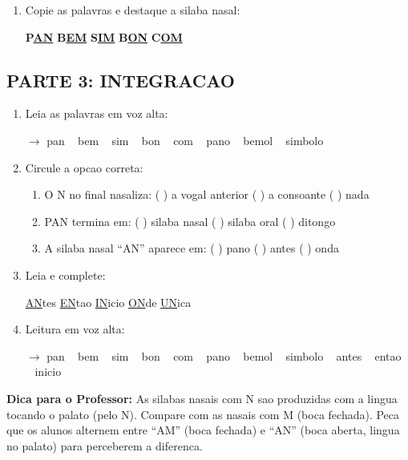 \begin{exercicio}
\begin{enumerate}[resume]
  \item Copie as palavras e destaque a silaba nasal:
  \begin{center}
  \textbf{P}\underline{\textbf{AN}} \quad \textbf{B}\underline{\textbf{EM}} \quad \textbf{S}\underline{\textbf{IM}} \quad \textbf{B}\underline{\textbf{ON}} \quad \textbf{C}\underline{\textbf{OM}}
  \end{center}
\end{enumerate}

\subsection*{PARTE 3: INTEGRACAO}

\begin{enumerate}[resume]
  \item Leia as palavras em voz alta:
  \begin{center}
  $\rightarrow$ pan  ~  bem  ~  sim  ~  bon  ~  com  ~  pano  ~  bemol  ~  simbolo
  \end{center}

  \item Circule a opcao correta:
  \begin{enumerate}[label=(\alph*)]
    \item O N no final nasaliza: ( ) a vogal anterior ( ) a consoante ( ) nada
    \item PAN termina em: ( ) silaba nasal ( ) silaba oral ( ) ditongo
    \item A silaba nasal ``AN'' aparece em: ( ) pano ( ) antes ( ) onda
  \end{enumerate}

  \item Leia e complete:
  \begin{center}
  \underline{AN}tes \quad \underline{EN}tao \quad \underline{IN}icio \quad \underline{ON}de \quad \underline{UN}ica
  \end{center}

  \item Leitura em voz alta:
  \begin{center}
  $\rightarrow$ pan  ~  bem  ~  sim  ~  bon  ~  com  ~  pano  ~  bemol  ~  simbolo  ~  antes  ~  entao  ~  inicio
  \end{center}
\end{enumerate}
\end{exercicio}

\begin{dica}
\textbf{Dica para o Professor:} As silabas nasais com N sao produzidas com a lingua tocando o palato (pelo N). Compare com as nasais com M (boca fechada). Peca que os alunos alternem entre ``AM'' (boca fechada) e ``AN'' (boca aberta, lingua no palato) para perceberem a diferenca.
\end{dica}

